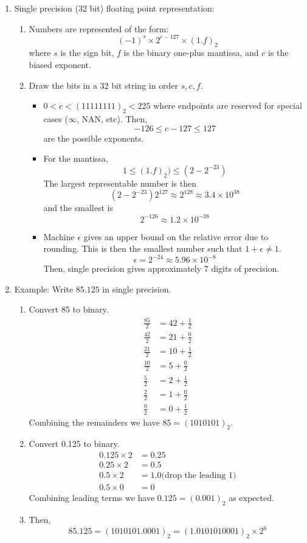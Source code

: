 \documentclass{article}
\theoremstyle{remark}
\begin{document}
\begin{enumerate}
\item Single precision (32 bit) floating point representation:
\begin{enumerate}
\item Numbers are represented of the form:
\[
(-1)^s \times 2^{c-127} \times (1.f)_2
\]
where $s$ is the sign bit, $f$ is the binary one-plus mantissa, and $c$ is the biased exponent.
\item Draw the bits in a 32 bit string in order $s, c, f$. 
\begin{itemize}
\item $0 < c < (11111111)_2 < 225$ where endpoints are reserved for special cases ($\infty$, NAN, etc). Then,
\[
-126 \leq c-127 \leq 127
\]
are the possible exponents.
\item For the mantissa,
\[
1 \leq (1.f)_2) \leq (2-2^{-23})
\]
The largest representable number is then 
\[
(2-2^{-23})2^{127} \approx 2^{128} \approx 3.4 \times 10^{38}
\]
and the smallest is 
\[
2^{-126} \approx 1.2 \times 10^{-38}
\]
\item Machine $\epsilon$ gives an upper bound on the relative error due to rounding. This is then the smallest number such that $1 + \epsilon \neq 1$.
\[
\epsilon = 2^{-24} \approx 5.96 \times 10^{-8}
\]  
Then, single precision gives approximately 7 digits of precision.
\end{itemize}

\end{enumerate}

\item Example: Write $85.125$ in single precision.
\begin{enumerate}
\item Convert 85 to binary.
\begin{align*}
\frac{85}{2} &= 42 + \frac{1}{2} \\
\frac{42}{2} &= 21 + \frac{0}{2} \\
\frac{21}{2} &= 10 + \frac{1}{2} \\
\frac{10}{2} &= 5 + \frac{0}{2} \\
\frac{5}{2} &= 2 + \frac{1}{2} \\
\frac{2}{2} &= 1 + \frac{0}{2}  \\
\frac{0}{2} &= 0 + \frac{1}{2}  
\end{align*}
Combining the remainders we have $85 = (1010101)_2$. 
\item Convert 0.125 to binary.
\begin{align*}
0.125 \times 2 &= 0.25 \\
0.25 \times 2 &= 0.5 \\
0.5 \times 2 &= 1.0 \text{(drop the leading 1)}\\
0.5 \times 0 &= 0
\end{align*}
Combining leading terms we have $0.125 = (0.001)_2$ as expected.
\item Then, 
\[
85.125 = (1010101.0001)_2 = (1.0101010001)_2 \times 2^{6}
\]
\end{enumerate}


\end{enumerate}
\end{document}
